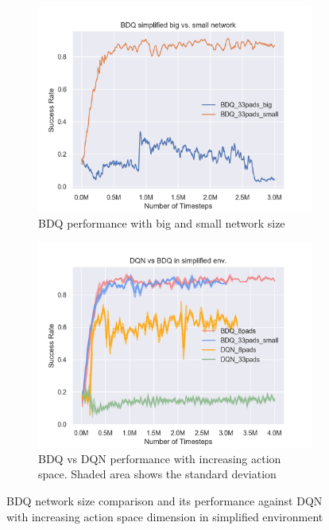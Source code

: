 \begin{figure}[!htbp]
    \begin{subfigure}{0.49\textwidth}
        \includegraphics[width=\linewidth]{figures/BDQ_simplified_big_vs_small_network_no_var}
        \caption{BDQ performance with big and small network size} \label{fig:BDQnetwork}
    \end{subfigure}%
    \hspace*{\fill}   %
    \begin{subfigure}{0.49\textwidth}
        \includegraphics[width=\linewidth]{figures/DQN_vs_BDQ_in_simplified_env}
        \caption{BDQ vs DQN performance with increasing action space. Shaded area shows the standard deviation} \label{fig:BDQDQNsimp}
    \end{subfigure}%
    \hspace*{\fill}   %
\caption{ BDQ network size comparison and its performance against DQN with increasing action space dimension in simplified environment\label{fig:BDQDQN}}
\end{figure}

